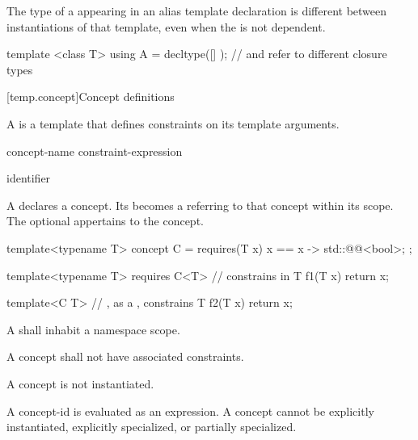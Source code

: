 \pnum
The type of a 
appearing in an alias template declaration
is different between instantiations of that template,
even when the  is not dependent.
\begin{example}
\begin{codeblock}
template <class T>
  using A = decltype([] { });   //  and  refer to different closure types
\end{codeblock}
\end{example}

[temp.concept]{Concept definitions}

\pnum
A  is a template
that defines constraints on its template arguments.

\begin{bnf}
\br
   concept-name  \terminal{=} constraint-expression \terminal{;}
\end{bnf}

\begin{bnf}
\br
  identifier
\end{bnf}

\pnum
A 
declares a concept.
Its  becomes a 
referring to that concept
within its scope.
The optional  appertains to the concept.
\begin{example}
\begin{codeblock}
template<typename T>
concept C = requires(T x) {
  { x == x } -> std::@@<bool>;
};

template<typename T>
  requires C<T>     //  constrains  in 
T f1(T x) { return x; }

template<C T>       // , as a , constrains 
T f2(T x) { return x; }
\end{codeblock}
\end{example}

\pnum
A 
shall inhabit a namespace scope.

\pnum
A concept shall not have associated constraints.

\pnum
A concept is not instantiated.
\begin{note}
A concept-id is evaluated as an expression.
A concept cannot be
explicitly instantiated,
explicitly specialized,
or partially specialized.
\end{note}

